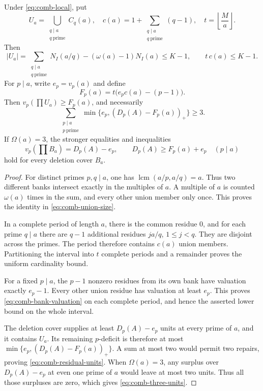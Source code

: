 \begin{proposition}
\label{prop:comb-union}
Under \eqref{eq:comb-local}, put
\[
 U_a=\bigcup_{\substack{q\mid a\\q\ \mathrm{prime}}}C_q(a),
 \quad c(a)=1+\sum_{\substack{q\mid a\\q\ \mathrm{prime}}}(q-1),
 \quad t=\left\lfloor\frac Ma\right\rfloor.
\]
Then
\begin{equation}
 |U_a|=\sum_{\substack{q\mid a\\q\ \mathrm{prime}}}N_I(a/q)
       -(\omega(a)-1)N_I(a)\le K-1,
 \qquad t\,c(a)\le K-1.
 \label{eq:comb-union-size}
\end{equation}
For $p\mid a$, write $e_p=v_p(a)$ and define
\begin{equation}
 F_p(a)=t\bigl(e_pc(a)-(p-1)\bigr).
 \label{eq:comb-bank-valuation}
\end{equation}
Then $v_p(\prod U_a)\ge F_p(a)$, and necessarily
\begin{equation}
 \sum_{\substack{p\mid a\\p\ \mathrm{prime}}}
       \min\{e_p,(D_p(A)-F_p(a))_+\}\ge3.
 \label{eq:comb-residual-units}
\end{equation}
If $\Omega(a)=3$, the stronger equalities and inequalities
\begin{equation}
 v_p\!\left(\prod B_a\right)=D_p(A)-e_p,
 \qquad D_p(A)\ge F_p(a)+e_p\quad(p\mid a)
 \label{eq:comb-three-units}
\end{equation}
hold for every deletion cover $B_a$.
\end{proposition}

\begin{proof}
For distinct primes $p,q\mid a$, one has
$\operatorname{lcm}(a/p,a/q)=a$. Thus two different banks intersect
exactly in the multiples of $a$. A multiple of $a$ is counted
$\omega(a)$ times in the sum, and every other union member only
once. This proves the identity in \eqref{eq:comb-union-size}.

In a complete period of length $a$, there is the common residue
$0$, and for each prime $q\mid a$ there are $q-1$ additional
residues $ja/q$, $1\le j<q$. They are disjoint across the primes.
The period therefore contains $c(a)$ union members. Partitioning
the interval into $t$ complete periods and a remainder proves the
uniform cardinality bound.

For a fixed $p\mid a$, the $p-1$ nonzero residues from its own bank
have valuation exactly $e_p-1$. Every other union residue has
valuation at least $e_p$. This proves
\eqref{eq:comb-bank-valuation} on each complete period, and hence
the asserted lower bound on the whole interval.

The deletion cover supplies at least $D_p(A)-e_p$ units at every
prime of $a$, and it contains $U_a$. Its remaining $p$-deficit is
therefore at most $\min\{e_p,(D_p(A)-F_p(a))_+\}$. A sum at most
two would permit two repairs, proving \eqref{eq:comb-residual-units}.
When $\Omega(a)=3$, any surplus over $D_p(A)-e_p$ at even one prime
of $a$ would leave at most two units. Thus all those surpluses are
zero, which gives \eqref{eq:comb-three-units}.
\end{proof}

